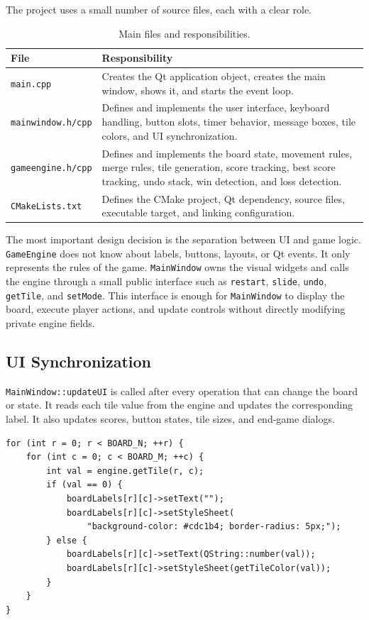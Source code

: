 \documentclass[a4paper,12pt]{article}
\begin{document}
The project uses a small number of source files, each with a clear role.

\begin{table}[H]
\centering
\begin{tabular}{|p{4cm}|p{10cm}|}
\hline
\textbf{File} & \textbf{Responsibility} \\
\hline
\texttt{main.cpp} & Creates the Qt application object, creates the main window, shows it, and starts the event loop. \\
\hline
\texttt{mainwindow.h/cpp} & Defines and implements the user interface, keyboard handling, button slots, timer behavior, message boxes, tile colors, and UI synchronization. \\
\hline
\texttt{gameengine.h/cpp} & Defines and implements the board state, movement rules, merge rules, tile generation, score tracking, best score tracking, undo stack, win detection, and loss detection. \\
\hline
\texttt{CMakeLists.txt} & Defines the CMake project, Qt dependency, source files, executable target, and linking configuration. \\
\hline
\end{tabular}
\caption{Main files and responsibilities.}
\end{table}

The most important design decision is the separation between UI and game logic. \texttt{GameEngine} does not know about labels, buttons, layouts, or Qt events. It only represents the rules of the game. \texttt{MainWindow} owns the visual widgets and calls the engine through a small public interface such as \texttt{restart}, \texttt{slide}, \texttt{undo}, \texttt{getTile}, and \texttt{setMode}. This interface is enough for \texttt{MainWindow} to display the board, execute player actions, and update controls without directly modifying private engine fields.

\subsection*{UI Synchronization}

\texttt{MainWindow::updateUI} is called after every operation that can change the board or state. It reads each tile value from the engine and updates the corresponding label. It also updates scores, button states, tile sizes, and end-game dialogs.

\begin{lstlisting}[style=CppStyle,caption={Synchronizing tile labels with the engine board}]
for (int r = 0; r < BOARD_N; ++r) {
    for (int c = 0; c < BOARD_M; ++c) {
        int val = engine.getTile(r, c);
        if (val == 0) {
            boardLabels[r][c]->setText("");
            boardLabels[r][c]->setStyleSheet(
                "background-color: #cdc1b4; border-radius: 5px;");
        } else {
            boardLabels[r][c]->setText(QString::number(val));
            boardLabels[r][c]->setStyleSheet(getTileColor(val));
        }
    }
}
\end{lstlisting}
\end{document}
